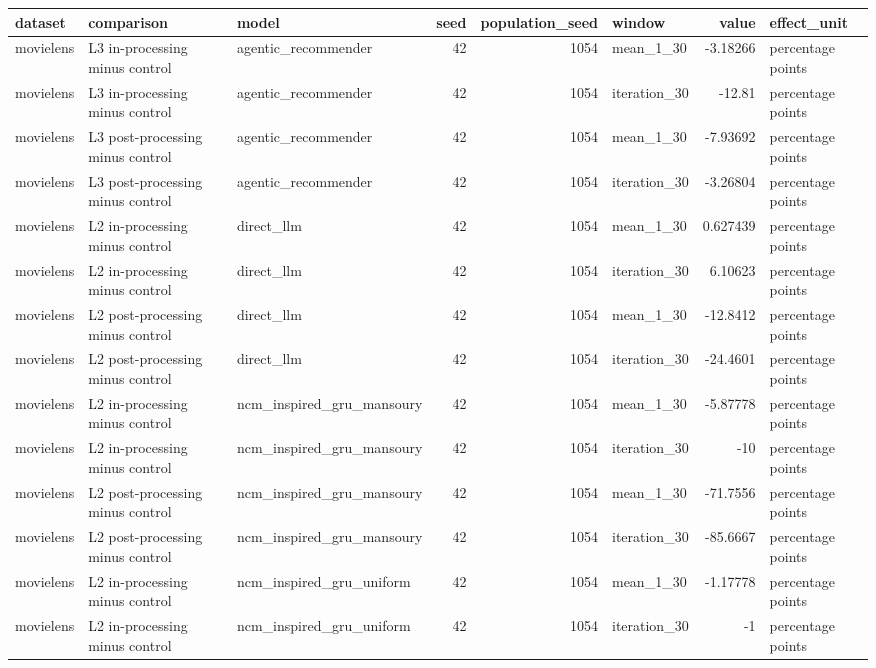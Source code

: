 \begin{table}[htbp!]
\centering
\small
\setlength{\tabcolsep}{3pt}
\renewcommand{\arraystretch}{1.1}
\begin{tabular}{lllrrlrl}
\hline
dataset & comparison & model & seed & population\_seed & window & value & effect\_unit \\
\hline
movielens & L3 in-processing minus control & agentic\_recommender & 42 & 1054 & mean\_1\_30 & -3.18266 & percentage points \\
movielens & L3 in-processing minus control & agentic\_recommender & 42 & 1054 & iteration\_30 & -12.81 & percentage points \\
movielens & L3 post-processing minus control & agentic\_recommender & 42 & 1054 & mean\_1\_30 & -7.93692 & percentage points \\
movielens & L3 post-processing minus control & agentic\_recommender & 42 & 1054 & iteration\_30 & -3.26804 & percentage points \\
movielens & L2 in-processing minus control & direct\_llm & 42 & 1054 & mean\_1\_30 & 0.627439 & percentage points \\
movielens & L2 in-processing minus control & direct\_llm & 42 & 1054 & iteration\_30 & 6.10623 & percentage points \\
movielens & L2 post-processing minus control & direct\_llm & 42 & 1054 & mean\_1\_30 & -12.8412 & percentage points \\
movielens & L2 post-processing minus control & direct\_llm & 42 & 1054 & iteration\_30 & -24.4601 & percentage points \\
movielens & L2 in-processing minus control & ncm\_inspired\_gru\_mansoury & 42 & 1054 & mean\_1\_30 & -5.87778 & percentage points \\
movielens & L2 in-processing minus control & ncm\_inspired\_gru\_mansoury & 42 & 1054 & iteration\_30 & -10 & percentage points \\
movielens & L2 post-processing minus control & ncm\_inspired\_gru\_mansoury & 42 & 1054 & mean\_1\_30 & -71.7556 & percentage points \\
movielens & L2 post-processing minus control & ncm\_inspired\_gru\_mansoury & 42 & 1054 & iteration\_30 & -85.6667 & percentage points \\
movielens & L2 in-processing minus control & ncm\_inspired\_gru\_uniform & 42 & 1054 & mean\_1\_30 & -1.17778 & percentage points \\
movielens & L2 in-processing minus control & ncm\_inspired\_gru\_uniform & 42 & 1054 & iteration\_30 & -1 & percentage points \\

\end{tabular}
\end{table}
